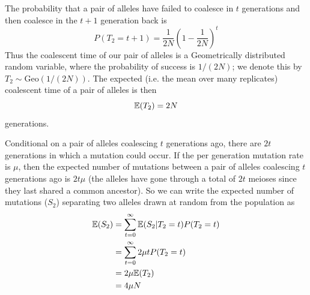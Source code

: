 The probability that a pair of alleles
have failed to coalesce in $t$ generations and then coalesce in the
$t+1$ generation back is
\begin{equation}
 P(T_2=t+1) = \frac{1}{2N} \left(1- \frac{1}{2N} \right)^{t} \label{eqn:coal_time_dist}
\end{equation}
Thus the coalescent time of our pair of alleles is a Geometrically distributed random variable, where the probability of success is $1/(2N)$; we denote this by $T_2 \sim  \text{Geo}(1/(2N))$.
The expected (i.e. the mean over many replicates) coalescent time of a pair of alleles is then
\begin{equation}
\mathbb{E}(T_2) = 2N
\end{equation}
generations.\\


Conditional on a pair of alleles coalescing $t$ generations ago,
there are $2t$ generations in which a mutation could occur. If the per
generation mutation rate is $\mu$, then the expected number of
mutations between a pair of alleles coalescing $t$ generations ago is
$2 t\mu$ (the alleles have gone through a total of $2t$ meioses since they last shared a common ancestor). So we can write the expected
number of mutations ($S_2$) separating two alleles drawn at random from the
population as %
\begin{align}
\mathbb{E}(S_2) &= \sum_{t=0}^{\infty} \mathbb{E}(S_2 | T_2=t) P(T_2=t) \nonumber\\
& =\sum_{t=0}^{\infty} 2 \mu t P(T_2=t) \nonumber\\
& =2\mu \mathbb{E}(T_2)  \nonumber\\
& = 4 \mu N
\end{align}

